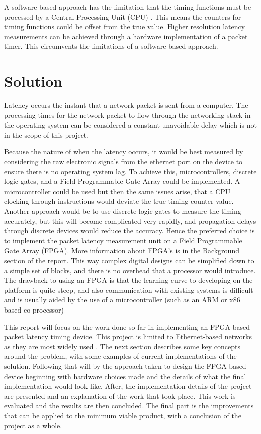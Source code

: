 A software-based approach has the limitation that the timing functions must be processed by a
Central Processing Unit (CPU) \cite{CPUtiming}. This means the counters for timing functions could be offset from 
the true value. Higher resolution latency measurements can be achieved through a hardware implementation of a packet
timer. This circumvents the limitations of a software-based approach.

\section{Solution}

Latency occurs the instant that a network packet is sent from a computer. The processing times for the network packet
to flow through the networking stack in the operating system can be considered a constant unavoidable delay which is
not in the scope of this project.

Because the nature of when the latency occurs, it would be best measured by considering the raw electronic signals 
from the ethernet port on the device to ensure there is no operating system lag. To achieve this, microcontrollers, 
discrete logic gates, and a Field Programmable Gate Array could be implemented. A microcontroller could be used but 
then the same issues arise, that a CPU clocking through instructions would deviate the true timing counter value. 
Another approach would be to use discrete logic gates to measure the timing accurately, but this will become 
complicated very rapidly, and propagation delays through discrete devices would reduce the accuracy. Hence the 
preferred choice is to implement the packet latency measurement unit on a Field Programmable Gate Array (FPGA). More 
information about FPGA’s is in the Background section of the report. This way complex digital designs can be 
simplified down to a simple set of blocks, and there is no overhead that a processor would introduce. The drawback 
to using an FPGA is that the learning curve to developing on the platform is quite steep, and also communication 
with existing systems is difficult and is usually aided by the use of a microcontroller (such as an ARM or x86 based 
co-processor)

\par This report will focus on the work done so far in implementing an FPGA based packet latency timing
device. This project is limited to Ethernet-based networks as they are most widely used \cite{etherneteverywhere}.
The next section describes some key concepts around the problem, with some examples of current implementations of the
solution. Following that will by the approach taken to design the FPGA based device beginning with hardware choices
made and the details of what the final implementation would look like. After, the implementation details of the 
project are presented and an explanation of the work that took place. This work is evaluated and the results are then
concluded. The final part is the improvements that can be applied to the minimum viable product, with a conclusion of
the project as a whole.
